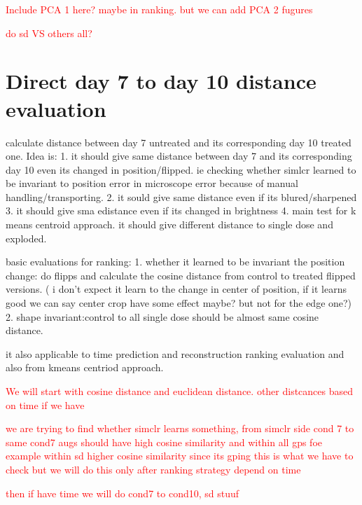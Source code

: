 \textcolor{red}{Include PCA 1 here? maybe in ranking. but we can add PCA 2 fugures}

\textcolor{red}{do sd VS others all?}





\section{Direct day 7 to day 10 distance evaluation}
calculate distance between day 7 untreated and its corresponding day 10 treated one.
Idea is:
1. it should give same distance between day 7 and its corresponding day 10
 even its changed in position/flipped. ie checking whether simlcr learned to 
 be invariant to position error in microscope error because of manual 
 handling/transporting.
2. it sould give same distance even if its blured/sharpened
3. it should give sma edistance even if its changed in brightness
4. main test for k means centroid approach. it should give different distance to single dose and exploded.


basic evaluations for ranking:
1.
whether it learned to be invariant the position change:
do flipps and calculate the cosine distance from control to treated flipped versions. ( i don't expect it learn to the change in center of position, 
if it learns good we can say center crop have some effect maybe? but not for the edge one?)
2. 
shape invariant:control to all single dose should be almost same cosine distance.

it also applicable to time prediction and reconstruction ranking evaluation and also from kmeans centriod approach.


\textcolor{red}{We will start with cosine distance and euclidean distance. other distcances based on time if we have}


\textcolor{red}{we are trying to find whether simclr learns something, from simclr side cond 7 to same cond7 augs should have high cosine similarity and within all
 gps foe example within sd higher cosine similarity since its gping this is what we have to check but we will do this only after ranking strategy depend on time}


 \textcolor{red}{then if have time we will do cond7 to cond10, sd stuuf}

